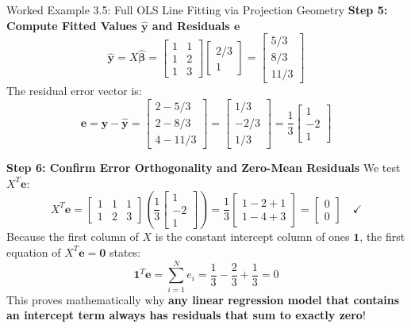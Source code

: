 \begin{examplebox}{Worked Example 3.5: Full OLS Line Fitting via Projection Geometry}
\textbf{Step 5: Compute Fitted Values $\hat{\mathbf{y}}$ and Residuals $\mathbf{e}$}
\begin{equation*}
\hat{\mathbf{y}} = X\hat{\boldsymbol{\beta}} = \begin{bmatrix} 1 & 1 \\ 1 & 2 \\ 1 & 3 \end{bmatrix} \begin{bmatrix} 2/3 \\ 1 \end{bmatrix} = \begin{bmatrix} 5/3 \\ 8/3 \\ 11/3 \end{bmatrix}
\end{equation*}
The residual error vector is:
\begin{equation*}
\mathbf{e} = \mathbf{y} - \hat{\mathbf{y}} = \begin{bmatrix} 2 - 5/3 \\ 2 - 8/3 \\ 4 - 11/3 \end{bmatrix} = \begin{bmatrix} 1/3 \\ -2/3 \\ 1/3 \end{bmatrix} = \frac{1}{3} \begin{bmatrix} 1 \\ -2 \\ 1 \end{bmatrix}
\end{equation*}

\textbf{Step 6: Confirm Error Orthogonality and Zero-Mean Residuals}
We test $X^T \mathbf{e}$:
\begin{equation*}
X^T \mathbf{e} = \begin{bmatrix} 1 & 1 & 1 \\ 1 & 2 & 3 \end{bmatrix} \left( \frac{1}{3} \begin{bmatrix} 1 \\ -2 \\ 1 \end{bmatrix} \right) = \frac{1}{3} \begin{bmatrix} 1 - 2 + 1 \\ 1 - 4 + 3 \end{bmatrix} = \begin{bmatrix} 0 \\ 0 \end{bmatrix} \quad \checkmark
\end{equation*}
Because the first column of $X$ is the constant intercept column of ones $\mathbf{1}$, the first equation of $X^T \mathbf{e} = \mathbf{0}$ states:
\begin{equation*}
\mathbf{1}^T \mathbf{e} = \sum_{i=1}^N e_i = \frac{1}{3} - \frac{2}{3} + \frac{1}{3} = 0
\end{equation*}
This proves mathematically why \textbf{any linear regression model that contains an intercept term always has residuals that sum to exactly zero}!
\end{examplebox}

